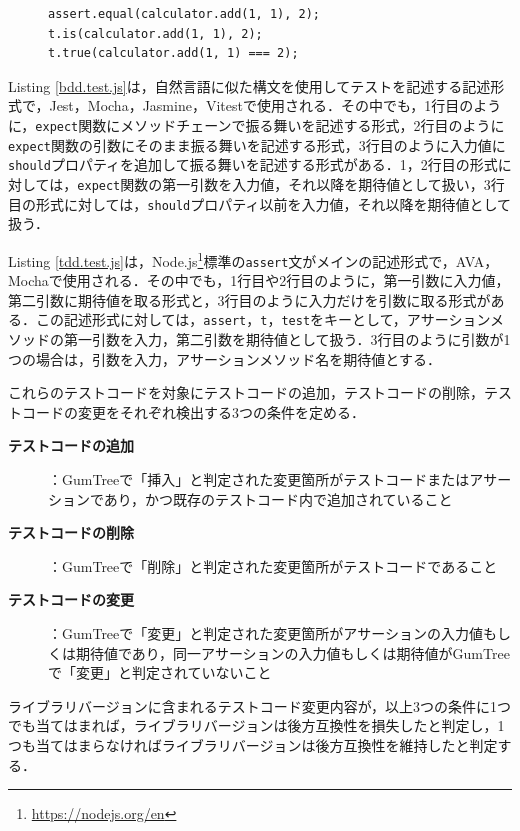 \documentclass[submit]{ipsj}
\begin{document}
{\begin{figure}[t]
\vspace{-3mm}

\begin{lstlisting}[caption=アサーション例2, label=tdd.test.js]
assert.equal(calculator.add(1, 1), 2);
t.is(calculator.add(1, 1), 2);  
t.true(calculator.add(1, 1) === 2);
\end{lstlisting}
\vspace{-3mm}
\end{figure}



Listing \ref{bdd.test.js}は，自然言語に似た構文を使用してテストを記述する記述形式で，Jest，Mocha，Jasmine，Vitestで使用される．その中でも，1行目のように，{\verb|expect|}関数にメソッドチェーンで振る舞いを記述する形式，2行目のように{\verb|expect|}関数の引数にそのまま振る舞いを記述する形式，3行目のように入力値に{\verb|should|}プロパティを追加して振る舞いを記述する形式がある．1，2行目の形式に対しては，{\verb|expect|}関数の第一引数を入力値，それ以降を期待値として扱い，3行目の形式に対しては，{\verb|should|}プロパティ以前を入力値，それ以降を期待値として扱う．


Listing \ref{tdd.test.js}は，Node.js\footnote{\url{https://nodejs.org/en}}標準の{\verb|assert|}文がメインの記述形式で，AVA，Mochaで使用される．その中でも，1行目や2行目のように，第一引数に入力値，第二引数に期待値を取る形式と，3行目のように入力だけを引数に取る形式がある．この記述形式に対しては，{\verb|assert|}，{\verb|t|}，{\verb|test|}をキーとして，アサーションメソッドの第一引数を入力，第二引数を期待値として扱う．3行目のように引数が1つの場合は，引数を入力，アサーションメソッド名を期待値とする．

これらのテストコードを対象にテストコードの追加，テストコードの削除，テストコードの変更をそれぞれ検出する3つの条件を定める．

\begin{description}
  \item[\textbf{テストコードの追加}]：GumTreeで「挿入」と判定された変更箇所がテストコードまたはアサーションであり，かつ既存のテストコード内で追加されていること
  \item[\textbf{テストコードの削除}]：GumTreeで「削除」と判定された変更箇所がテストコードであること
  \item[\textbf{テストコードの変更}]：GumTreeで「変更」と判定された変更箇所がアサーションの入力値もしくは期待値であり，同一アサーションの入力値もしくは期待値がGumTreeで「変更」と判定されていないこと
\end{description}

ライブラリバージョンに含まれるテストコード変更内容が，以上3つの条件に1つでも当てはまれば，ライブラリバージョンは後方互換性を損失したと判定し，1つも当てはまらなければライブラリバージョンは後方互換性を維持したと判定する．

}
\end{document}
